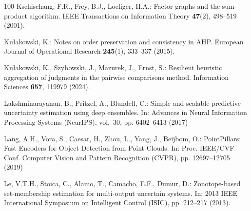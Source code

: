 \documentclass[graybox,envcountchap]{style/SNmono}
\begin{document}
\begin{thebibliography}{100}
Kschischang, F.R., Frey, B.J., Loeliger, H.A.: Factor graphs and the
  sum-product algorithm.
\newblock IEEE Transactions on Information Theory \textbf{47}(2), 498--519
  (2001).
\newblock {}



Ku{\l}akowski, K.: Notes on order preservation and consistency in {AHP}.
\newblock European Journal of Operational Research \textbf{245}(1), 333--337
  (2015).
\newblock {}



Ku{\l}akowski, K., Szybowski, J., Mazurek, J., Ernst, S.: Resilient heuristic
  aggregation of judgments in the pairwise comparisons method.
\newblock Information Sciences \textbf{657}, 119979 (2024).
\newblock {}


{\color{red} 
Lakshminarayanan, B., Pritzel, A., Blundell, C.: Simple and scalable predictive
  uncertainty estimation using deep ensembles.
\newblock In: Advances in Neural Information Processing Systems (NeurIPS),
  vol.~30, pp. 6402--6413 (2017)

\par}
{\color{red} 
Lang, A.H., Vora, S., Caesar, H., Zhou, L., Yang, J., Beijbom, O.:
  {PointPillars: Fast Encoders for Object Detection from Point Clouds}.
\newblock In: Proc. IEEE/CVF Conf. Computer Vision and Pattern Recognition
  (CVPR), pp. 12697--12705 (2019)

\par}

Le, V.T.H., Stoica, C., Alamo, T., Camacho, E.F., Dumur, D.: Zonotope-based
  set-membership estimation for multi-output uncertain systems.
\newblock In: 2013 IEEE International Symposium on Intelligent Control (ISIC),
  pp. 212--217 (2013).
\newblock {}



\end{thebibliography}
\end{document}
